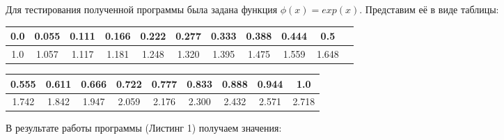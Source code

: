 \documentclass [12pt]{article}
\begin{document}
Для тестирования полученной программы была задана функция $\phi(x) = exp(x)$. Представим её в виде таблицы:

\begin{table}[h]
\begin{center}
\begin{tabular}{|c|c|c|c|c|c|c|c|c|c|c|}
\hline
0.0 & 0.055 & 0.111 & 0.166 & 0.222 & 0.277 & 0.333 & 0.388 & 0.444 & 0.5\\
\hline
1.0 & 1.057 & 1.117 & 1.181 & 1.248 & 1.320 & 1.395 & 1.475 & 1.559 & 1.648\\
\hline
\end{tabular}
\end{center}
\end{table}

\begin{table}[h]
\begin{center}
\begin{tabular}{|c|c|c|c|c|c|c|c|c|}
\hline
0.555 & 0.611 & 0.666 & 0.722 & 0.777 & 0.833 & 0.888 & 0.944 & 1.0 \\
\hline
1.742 & 1.842 & 1.947 & 2.059 & 2.176 & 2.300 & 2.432 & 2.571 & 2.718 \\
\hline
\end{tabular}
\end{center}
\end{table}

В результате работы программы (Листинг 1) получаем значения:
\end{document}

